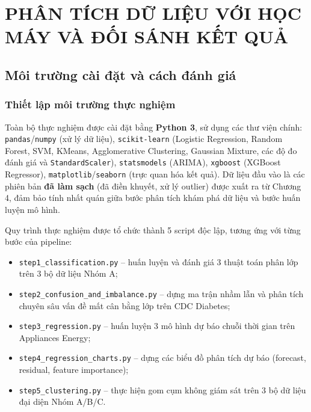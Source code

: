 \chapter{PHÂN TÍCH DỮ LIỆU VỚI HỌC MÁY VÀ ĐỐI SÁNH KẾT QUẢ}
\label{ch:chuong5}

\startcontents[chapters]

\section{Môi trường cài đặt và cách đánh giá}

\subsection{Thiết lập môi trường thực nghiệm}

Toàn bộ thực nghiệm được cài đặt bằng \textbf{Python 3}, sử dụng các thư viện chính: \texttt{pandas}/\texttt{numpy} (xử lý dữ liệu), \texttt{scikit-learn} (Logistic Regression, Random Forest, SVM, KMeans, Agglomerative Clustering, Gaussian Mixture, các độ đo đánh giá và \texttt{StandardScaler}), \texttt{statsmodels} (ARIMA), \texttt{xgboost} (XGBoost Regressor), \texttt{matplotlib}/\texttt{seaborn} (trực quan hóa kết quả). Dữ liệu đầu vào là các phiên bản \textbf{đã làm sạch} (đã điền khuyết, xử lý outlier) được xuất ra từ Chương 4, đảm bảo tính nhất quán giữa bước phân tích khám phá dữ liệu và bước huấn luyện mô hình.

Quy trình thực nghiệm được tổ chức thành 5 script độc lập, tương ứng với từng bước của pipeline:
\begin{itemize}
    \item \texttt{step1\_classification.py} -- huấn luyện và đánh giá 3 thuật toán phân lớp trên 3 bộ dữ liệu Nhóm A;
    \item \texttt{step2\_confusion\_and\_imbalance.py} -- dựng ma trận nhầm lẫn và phân tích chuyên sâu vấn đề mất cân bằng lớp trên CDC Diabetes;
    \item \texttt{step3\_regression.py} -- huấn luyện 3 mô hình dự báo chuỗi thời gian trên Appliances Energy;
    \item \texttt{step4\_regression\_charts.py} -- dựng các biểu đồ phân tích dự báo (forecast, residual, feature importance);
    \item \texttt{step5\_clustering.py} -- thực hiện gom cụm không giám sát trên 3 bộ dữ liệu đại diện Nhóm A/B/C.
\end{itemize}

